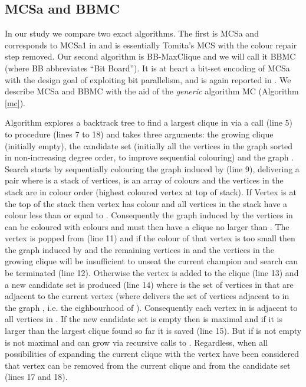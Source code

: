 \documentclass[runningheads]{llncs}
\begin{document}
\subsection{MCSa and BBMC}
In our study we compare two exact algorithms. The first is MCSa  and
corresponds to MCSa1 in \cite{exactProsser} and is essentially Tomita's MCS \cite{tomita2010} with the colour 
repair step removed. Our second algorithm is BB-MaxClique \cite{segundo2011} and we will call it BBMC (where BB abbreviates ``Bit Board'').
It is at heart a bit-set encoding of  MCSa with the design goal of exploiting bit parallelism, and is again reported
in \cite{exactProsser}. We describe MCSa and BBMC with the aid of the \emph{generic} algorithm MC (Algorithm \ref{mc}).

Algorithm  explores a backtrack tree to find a largest clique in  via a call (line 5) to procedure  (lines 7 to 18) 
and takes three arguments:
the growing clique  (initially empty), 
the candidate set  (initially all the vertices in the graph sorted in non-increasing degree order,
to improve sequential colouring) and 
the graph .
Search starts by sequentially colouring the graph \cite{welshPowell} induced by  (line 9), delivering a pair  where  is a stack
of vertices,  is an array of colours and the vertices in the stack are in colour order (highest coloured vertex at top of stack).
If Vertex  is at the top of the stack then vertex  has colour  and 
all vertices in the stack have a colour less than or equal to . Consequently the graph induced by the
vertices in  can be coloured with  colours and must then have a clique no larger than .
The vertex  is popped from  (line 11) and if the colour of that vertex is too small then
the graph induced by  and the remaining vertices in  and the vertices in the growing clique 
will be insufficient to unseat the current champion and search can be terminated (line 12). 
Otherwise the vertex  is added to the clique  (line 13) 
and a new candidate set is produced   (line 14) where  is the set of vertices in  that are adjacent to the current vertex 
(where  delivers the set of vertices adjacent to  in the graph , i.e. the eighbourhood of ).
Consequently each vertex in  is adjacent to all vertices in . If the new candidate set is empty then  is maximal
and if it is larger than the largest clique found so far it is saved (line 15). But if  is not empty  is not maximal
and  can grow via recursive calls to . Regardless, when all possibilities of expanding the 
current clique with the vertex  have been considered that vertex can be removed from the current clique
and from the candidate set (lines 17 and 18).
\end{document}
